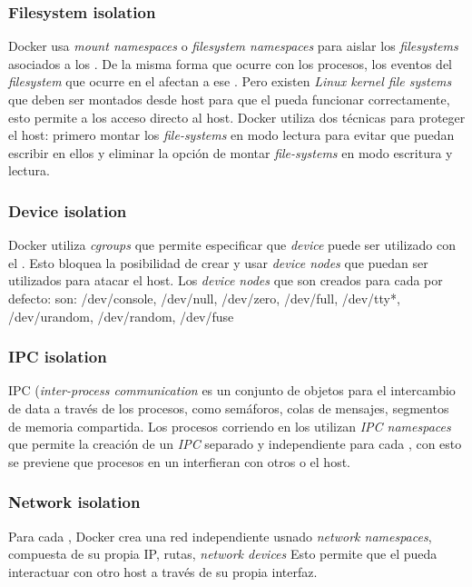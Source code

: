 \documentclass[letter,10pt]{article}
\begin{document}
	\subsubsection{Filesystem isolation}
	
	Docker usa \emph{mount namespaces} o \emph{filesystem namespaces} para aislar los \emph{filesystems} asociados a los \containers. De la misma forma que ocurre con los procesos, los eventos del \emph{filesystem} que ocurre en el \container afectan a ese \container.
	Pero existen \emph{Linux kernel file systems} que deben ser montados desde host para que el \container pueda funcionar correctamente, esto permite a los \containers acceso directo al host. Docker utiliza dos técnicas para proteger el host: primero montar los \emph{file-systems} en modo lectura para evitar que puedan escribir en ellos y eliminar la opción de montar \emph{file-systems} en modo escritura y lectura. \cite{walsh:2014:Online}
	
	\subsubsection{Device isolation}
	Docker utiliza \emph{cgroups} que permite especificar que \emph{device} puede ser utilizado con el \container. Esto bloquea la posibilidad de crear y usar \emph{device nodes} que puedan ser utilizados para atacar el host. Los \emph{device nodes} que son creados para cada \container por defecto: son: /dev/console, /dev/null, /dev/zero, /dev/full, /dev/tty*, /dev/urandom, /dev/random, /dev/fuse \cite{walsh:2014:Online}
	
	\subsubsection{IPC isolation}
	IPC (\emph{inter-process communication} es un conjunto de objetos para el intercambio de data a través de los procesos, como semáforos, colas de mensajes, segmentos de memoria compartida. Los procesos corriendo en los \containers utilizan \emph{IPC namespaces} que permite la creación de un \emph{IPC} separado y independiente para cada \container, con esto se previene que procesos en un \container interfieran con otros \containers o el host.
	
		
	\subsubsection{Network isolation}
	Para cada \container, Docker crea una red independiente usnado \emph{network namespaces}, compuesta de su propia IP, rutas, \emph{network devices} Esto permite que el \container pueda interactuar con otro host a través de su propia interfaz.
\end{document}
